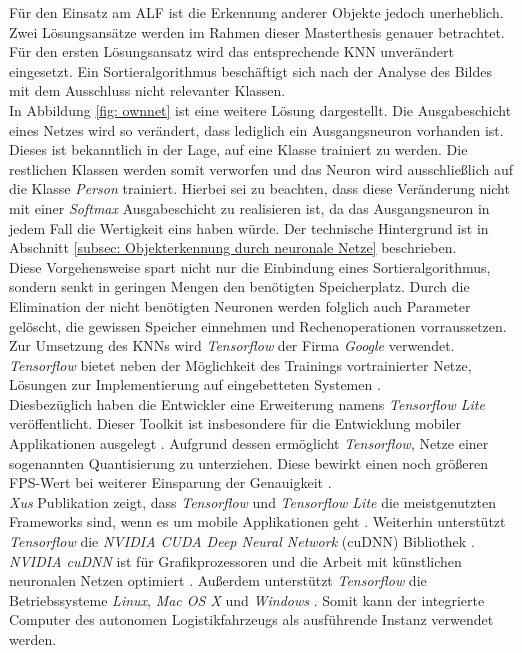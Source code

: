 		
		\newpage
		Für den Einsatz am ALF ist die Erkennung anderer Objekte jedoch unerheblich. Zwei Lösungsansätze werden im Rahmen dieser Masterthesis genauer betrachtet. Für den ersten Lösungsansatz wird das entsprechende KNN unverändert eingesetzt. Ein Sortieralgorithmus beschäftigt sich nach der Analyse des Bildes mit dem Ausschluss nicht relevanter Klassen.\\
		
		In Abbildung \ref{fig: ownnet} ist eine weitere Lösung dargestellt. Die Ausgabeschicht eines Netzes wird so verändert, dass lediglich ein Ausgangsneuron vorhanden ist. Dieses ist bekanntlich in der Lage, auf eine Klasse trainiert zu werden. Die restlichen Klassen werden somit verworfen und das Neuron wird ausschließlich auf die Klasse \textit{Person} trainiert. Hierbei sei zu beachten, dass diese Veränderung nicht mit einer \textit{Softmax} Ausgabeschicht zu realisieren ist, da das Ausgangsneuron in jedem Fall die Wertigkeit eins haben würde. Der technische Hintergrund ist in Abschnitt \ref{subsec: Objekterkennung durch neuronale Netze} beschrieben.\\
		
		Diese Vorgehensweise spart nicht nur die Einbindung eines Sortieralgorithmus, sondern senkt in geringen Mengen den benötigten Speicherplatz. Durch die Elimination der nicht benötigten Neuronen werden folglich auch Parameter gelöscht, die gewissen Speicher einnehmen und Rechenoperationen vorraussetzen.\\
		
		Zur Umsetzung des KNNs wird \textit{Tensorflow} der Firma \textit{Google} verwendet. \textit{Tensorflow} bietet neben der Möglichkeit des Trainings vortrainierter Netze, Lösungen zur Implementierung auf eingebetteten Systemen \cite{frameworks}.\\
		
		Diesbezüglich haben die Entwickler eine Erweiterung namens \textit{Tensorflow Lite} veröffentlicht. Dieser Toolkit ist insbesondere für die Entwicklung mobiler Applikationen ausgelegt \cite{tflite}. Aufgrund dessen ermöglicht \textit{Tensorflow}, Netze einer sogenannten Quantisierung zu unterziehen. Diese bewirkt einen noch größeren FPS-Wert bei weiterer Einsparung der Genauigkeit \cite{tflite}.\\
		
		\textit{Xus} Publikation zeigt, dass \textit{Tensorflow} und \textit{Tensorflow Lite} die meistgenutzten Frameworks sind, wenn es um mobile Applikationen geht \cite{warumtf}. Weiterhin unterstützt \textit{Tensorflow} die \textit{NVIDIA CUDA Deep Neural Network} (cuDNN) Bibliothek \cite{frameworks}. \textit{NVIDIA cuDNN} ist für Grafikprozessoren und die Arbeit mit künstlichen neuronalen Netzen optimiert \cite{frameworks}. Außerdem unterstützt \textit{Tensorflow} die Betriebssysteme \textit{Linux}, \textit{Mac OS X} und \textit{Windows} \cite{frameworks}. Somit kann der integrierte Computer des autonomen Logistikfahrzeugs als ausführende Instanz verwendet werden.\\
		
